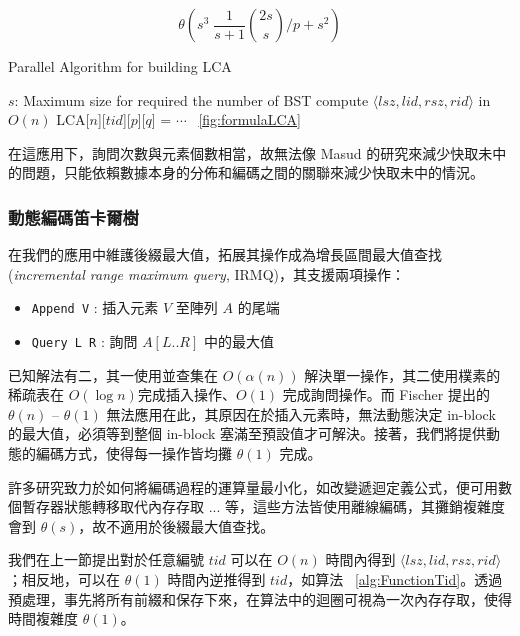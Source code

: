 \documentclass{gapd}
\begin{document}
$$\theta\left(s^3 \; \frac{1}{s+1} \binom{2s}{s} \bigg/ p + s^2 \right)$$

\begin{algorithm*}
  \caption{Parallel Algorithm for building LCA}
  \label{alg:parallelLCA}
  \begin{algorithmic}[1]
    \Require
      $s$: Maximum size for required the number of BST
          \State compute $\langle\mathit{lsz},\mathit{lid},\mathit{rsz},\mathit{rid}\rangle$ in $O(n)$
            \State LCA[$n$][$\mathit{tid}$][$p$][$q$] = $\cdots$ ~\ref{fig:formulaLCA}
          \EndFor
        \EndParFor
      \EndParFor
    \EndFor
  \end{algorithmic}
\end{algorithm*}

在這應用下，詢問次數與元素個數相當，故無法像 Masud \cite{masud} 的研究來減少快取未中的問題，只能依賴數據本身的分佈和編碼之間的關聯來減少快取未中的情況。

\subsubsection{動態編碼笛卡爾樹}

在我們的應用中維護後綴最大值，拓展其操作成為增長區間最大值查找 (\emph{incremental range maximum query}, IRMQ)，其支援兩項操作：

\begin{itemize}
  \item \texttt{Append V} : 插入元素 $V$ 至陣列 $A$ 的尾端
  \item \texttt{Query L R} : 詢問 $A[L .. R]$ 中的最大值
\end{itemize}

已知解法有二，其一使用並查集在 $O(\alpha(n))$ 解決單一操作，其二使用樸素的稀疏表在 $O(\log n)$完成插入操作、$O(1)$ 完成詢問操作。而 Fischer \cite{fischer} 提出的 $\theta(n)$ -- $\theta(1)$ 無法應用在此，其原因在於插入元素時，無法動態決定 in-block 的最大值，必須等到整個 in-block 塞滿至預設值才可解決。接著，我們將提供動態的編碼方式，使得每一操作皆均攤 $\theta(1)$ 完成。

許多研究致力於如何將編碼過程的運算量最小化，如改變遞迴定義公式，便可用數個暫存器狀態轉移取代內存存取 ... 等，這些方法皆使用離線編碼，其攤銷複雜度會到 $\theta(s)$，故不適用於後綴最大值查找。

我們在上一節提出對於任意編號 $\mathit{tid}$ 可以在 $O(n)$ 時間內得到 $\langle\mathit{lsz},\mathit{lid},\mathit{rsz},\mathit{rid}\rangle$；相反地，可以在 $\theta(1)$ 時間內逆推得到 $\mathit{tid}$，如算法 ~\ref{alg:FunctionTid}。透過預處理，事先將所有前綴和保存下來，在算法中的迴圈可視為一次內存存取，使得時間複雜度 $\theta(1)$。
\end{document}
